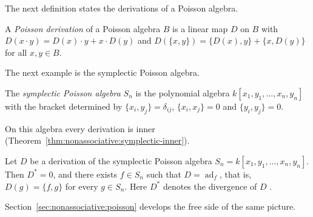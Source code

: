 The next definition states the derivations of a Poisson algebra.

\begin{definition}
\label{def:nonassociative:delta-poisson-derivation}
A \emph{Poisson derivation} of a Poisson algebra $B$ is a linear map
$D$ on $B$ with $D(x\cdot y)=D(x)\cdot y+x\cdot D(y)$ and
$D(\{x,y\})=\{D(x),y\}+\{x,D(y)\}$ for all $x,y\in B$.
\end{definition}

The next example is the symplectic Poisson algebra.

\begin{example}
\label{ex:nonassociative:symplectic-poisson}
The \emph{symplectic Poisson algebra} $S_n$ is the polynomial algebra
$k[x_1,y_1,\dots,x_n,y_n]$ with the bracket determined by
$\{x_i,y_j\}=\delta_{ij}$, $\{x_i,x_j\}=0$ and $\{y_i,y_j\}=0$.
\end{example}

On this algebra every derivation is inner (Theorem~\ref{thm:nonassociative:symplectic-inner}).

\begin{theorem}
\label{thm:nonassociative:symplectic-inner}
Let $D$ be a derivation of the symplectic Poisson algebra
$S_n=k[x_1,y_1,\dots,x_n,y_n]$. Then $D^{*}=0$, and there exists
$f\in S_n$ such that $D=\operatorname{ad}_f$, that is,
$D(g)=\{f,g\}$ for every $g\in S_n$. Here $D^{*}$ denotes the
divergence of $D$ \cite[p.~657]{AlbertiArestiLi2018Poisson}.
\end{theorem}

Section~\ref{sec:nonassociative:poisson} develops the free side of the %
same picture.
